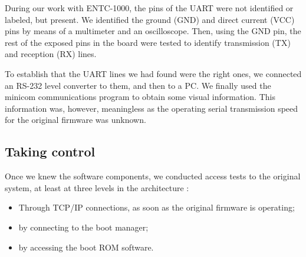 \documentclass[conference]{IEEEtran}
\newcommand{\nota}[1]{}
\begin{document}
\nota{
En nuestro trabajo con el ENTC-1000, los contactos (en inglés ``pins'') del UART
no se encontraban identificados o etiquetados, pero estaban presentes.
Utilizando un multímetro y un osciloscopio, se identificaron contactos
de tierra (GND) y de voltaje de corriente directa (VCC). Luego, utilizando
el contacto tierra, se probaron los demás contactos expuestos en la placa,
para identificar el contacto de transmisión (TX), y recepción (RX).
}
During our work with ENTC-1000, the pins of the UART were not identified or labeled, but present. We identified the ground (GND) and direct current (VCC) pins by means of a multimeter and an oscilloscope. Then, using the GND pin, the rest of the exposed pins in the board were tested to identify transmission (TX) and reception (RX) lines.
   
\nota {Para corroborar que los contactos del UART son los correctos, se conectó
el conversor de nivel RS-232 a los mismos, y luego a una PC.
Finalmente, se utilizó el programa de comunicaciones minicom para
obtener, al menos, información visual sin sentido, ya que
no se conocía a que velocidad de transmisión se encuentra operando
el firmware original.
}

To establish that the UART lines we had found were the right ones, we connected an RS-232 level converter to them, and then to a PC. We finally used the minicom communications program to obtain some visual information. This information was, however, meaningless as the operating serial transmission speed for the original firmware was unknown. 

\subsection{Taking control}
\nota {
Conociendo los componentes de software, se realizaron pruebas
de acceso al sistema original en al menos tres niveles de la arquitectura:
\begin{itemize}
\item A través de conexiones TCP/IP una vez que el firmware original está en ejecución,
\item a través del conexiones al gestor de arranque,
\item a través de accesos al software del boot rom.
\end{itemize}
}

Once we knew the software components, we conducted access tests to the original system, at least at three levels in the architecture :
\begin{itemize}
\item Through TCP/IP connections, as soon as the original firmware is operating;
\item by connecting to the boot manager;
\item by accessing the boot ROM software.
\end{itemize}
\end{document}
